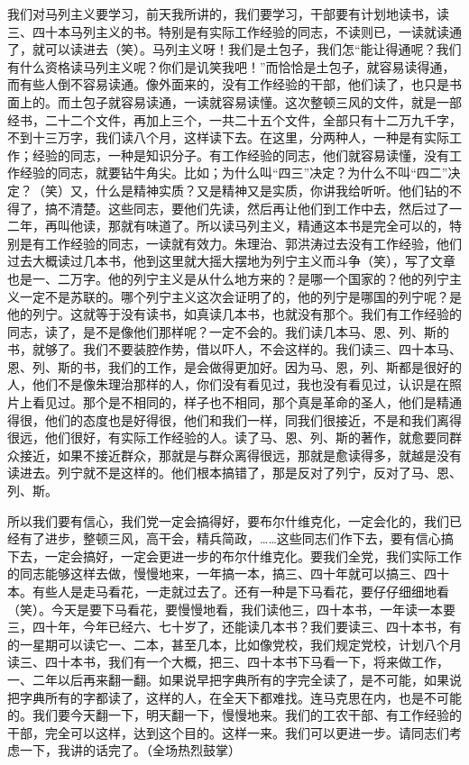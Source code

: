 我们对马列主义要学习，前天我所讲的，我们要学习，干部要有计划地读书，读三、四十本马列主义的书。特别是有实际工作经验的同志，不读则已，一读就读通了，就可以读进去（笑）。马列主义呀！我们是土包子，我们怎“能让得通呢？我们有什么资格读马列主义呢？你们是讥笑我吧！”而恰恰是土包子，就容易读得通，而有些人倒不容易读通。像外面来的，没有工作经验的干部，他们读了，也只是书面上的。而土包子就容易读通，一读就容易读懂。这次整顿三风的文件，就是一部经书，二十二个文件，再加上三个，一共二十五个文件，全部只有十二万九千字，不到十三万字，我们读八个月，这样读下去。在这里，分两种人，一种是有实际工作；经验的同志，一种是知识分子。有工作经验的同志，他们就容易读懂，没有工作经验的同志，就要钻牛角尖。比如；为什么叫“四三”决定？为什么不叫“四二”决定？（笑）又，什么是精神实质？又是精神又是实质，你讲我给听听。他们钻的不得了，搞不清楚。这些同志，要他们先读，然后再让他们到工作中去，然后过了一二年，再叫他读，那就有味道了。所以读马列主义，精通这本书是完全可以的，特别是有工作经验的同志，一读就有效力。朱理治、郭洪涛过去没有工作经验，他们过去大概读过几本书，他到这里就大摇大摆地为列宁主义而斗争（笑），写了文章也是一、二万字。他的列宁主义是从什么地方来的？是哪一个国家的？他的列宁主义一定不是苏联的。哪个列宁主义这次会证明了的，他的列宁是哪国的列宁呢？是他的列宁。这就等于没有读书，如真读几本书，也就没有那个。我们有工作经验的同志，读了，是不是像他们那样呢？一定不会的。我们读几本马、恩、列、斯的书，就够了。我们不要装腔作势，借以吓人，不会这样的。我们读三、四十本马、恩、列、斯的书，我们的工作，是会做得更加好。因为马、恩，列、斯都是很好的人，他们不是像朱理治那样的人，你们没有看见过，我也没有看见过，认识是在照片上看见过。那个是不相同的，样子也不相同，那个真是革命的圣人，他们是精通得很，他们的态度也是好得很，他们和我们一样，同我们很接近，不是和我们离得很远，他们很好，有实际工作经验的人。读了马、恩、列、斯的著作，就愈要同群众接近，如果不接近群众，那就是与群众离得很远，那就是愈读得多，就越是没有读进去。列宁就不是这样的。他们根本搞错了，那是反对了列宁，反对了马、恩、列、斯。

所以我们要有信心，我们党一定会搞得好，要布尔什维克化，一定会化的，我们已经有了进步，整顿三风，高干会，精兵简政，……这些同志们作下去，要有信心搞下去，一定会搞好，一定会更进一步的布尔什维克化。要我们全党，我们实际工作的同志能够这样去做，慢慢地来，一年搞一本，搞三、四十年就可以搞三、四十本。有些人是走马看花，一走就过去了。还有一种是下马看花，要仔仔细细地看（笑）。今天是要下马看花，要慢慢地看，我们读他三，四十本书，一年读一本要三，四十年，今年已经六、七十岁了，还能读几本书？我们要读三、四十本书，有的一星期可以读它一、二本，甚至几本，比如像党校，我们规定党校，计划八个月读三、四十本书，我们有一个大概，把三、四十本书下马看一下，将来做工作，一、二年以后再来翻一翻。如果说早把字典所有的字完全读了，是不可能，如果说把字典所有的字都读了，这样的人，在全天下都难找。连马克思在内，也是不可能的。我们要今天翻一下，明天翻一下，慢慢地来。我们的工农干部、有工作经验的干部，完全可以这样，达到这个目的。这样一来。我们可以更进一步。请同志们考虑一下，我讲的话完了。（全场热烈鼓掌）

